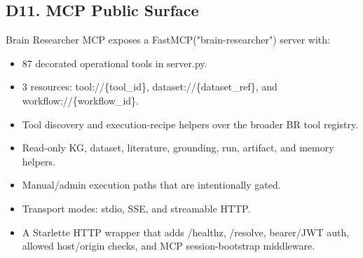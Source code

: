 \subsection{\texorpdfstring{\textbf{D11. MCP Public Surface} }{D11. MCP Public Surface }}\label{d11.-mcp-public-surface}

Brain Researcher MCP exposes a FastMCP("brain-researcher") server with:

\begin{itemize}
\item
  87 decorated operational tools in server.py.
\item
  3 resources: tool:/\allowbreak{}/\allowbreak{}\{tool\_\allowbreak{}id\}, dataset:/\allowbreak{}/\allowbreak{}\{dataset\_\allowbreak{}ref\}, and workflow:/\allowbreak{}/\allowbreak{}\{workflow\_\allowbreak{}id\}.
\item
  Tool discovery and execution-recipe helpers over the broader BR tool registry.
\item
  Read-only KG, dataset, literature, grounding, run, artifact, and memory helpers.
\item
  Manual/\allowbreak{}admin execution paths that are intentionally gated.
\item
  Transport modes: stdio, SSE, and streamable HTTP.
\item
  A Starlette HTTP wrapper that adds /\allowbreak{}healthz, /\allowbreak{}resolve, bearer/\allowbreak{}JWT auth, allowed host/\allowbreak{}origin checks, and MCP session-bootstrap middleware.
\end{itemize}

